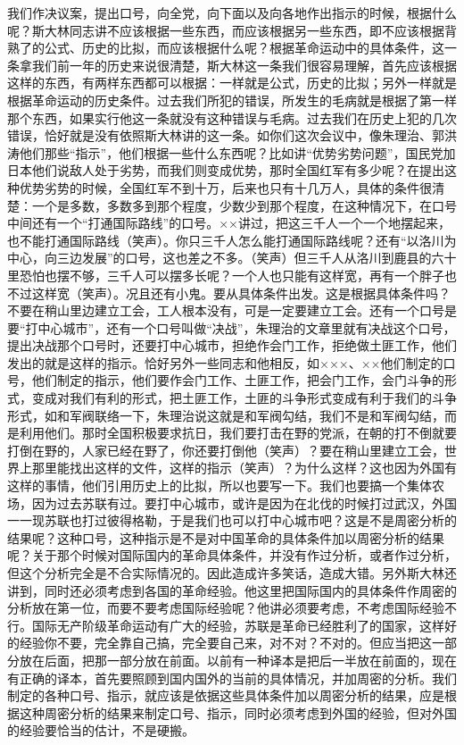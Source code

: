我们作决议案，提出口号，向全党，向下面以及向各地作出指示的时候，根据什么呢？斯大林同志讲不应该根据一些东西，而应该根据另一些东西，即不应该根据背熟了的公式、历史的比拟，而应该根据什么呢？根据革命运动中的具体条件，这一条拿我们前一年的历史来说很清楚，斯大林这一条我们很容易理解，首先应该根据这样的东西，有两样东西都可以根据：一样就是公式，历史的比拟；另外一样就是根据革命运动的历史条件。过去我们所犯的错误，所发生的毛病就是根据了第一样那个东西，如果实行他这一条就没有这种错误与毛病。过去我们在历史上犯的几次错误，恰好就是没有依照斯大林讲的这一条。如你们这次会议中，像朱理治、郭洪涛他们那些“指示”，他们根据一些什么东西呢？比如讲“优势劣势问题”，国民党加日本他们说敌人处于劣势，而我们则变成优势，那时全国红军有多少呢？在提出这种优势劣势的时候，全国红军不到十万，后来也只有十几万人，具体的条件很清楚：一个是多数，多数多到那个程度，少数少到那个程度，在这种情况下，在口号中间还有一个“打通国际路线”的口号。××讲过，把这三千人一个一个地摆起来，也不能打通国际路线（笑声）。你只三千人怎么能打通国际路线呢？还有“以洛川为中心，向三边发展”的口号，这也差之不多。（笑声）但三千人从洛川到鹿县的六十里恐怕也摆不够，三千人可以摆多长呢？一个人也只能有这样宽，再有一个胖子也不过这样宽（笑声）。况且还有小鬼。要从具体条件出发。这是根据具体条件吗？不要在稍山里边建立工会，工人根本没有，可是一定要建立工会。还有一个口号是要“打中心城市”，还有一个口号叫做“决战”，朱理治的文章里就有决战这个口号，提出决战那个口号时，还要打中心城市，担绝作会门工作，拒绝做土匪工作，他们发出的就是这样的指示。恰好另外一些同志和他相反，如×××、××他们制定的口号，他们制定的指示，他们要作会门工作、土匪工作，把会门工作，会门斗争的形式，变成对我们有利的形式，把土匪工作，土匪的斗争形式变成有利于我们的斗争形式，如和军阀联络一下，朱理治说这就是和军阀勾结，我们不是和军阀勾结，而是利用他们。那时全国积极要求抗日，我们要打击在野的党派，在朝的打不倒就要打倒在野的，人家已经在野了，你还要打倒他（笑声）？要在稍山里建立工会，世界上那里能找出这样的文件，这样的指示（笑声）？为什么这样？这也因为外国有这样的事情，他们引用历史上的比拟，所以也要写一下。我们也要搞一个集体农场，因为过去苏联有过。要打中心城市，或许是因为在北伐的时候打过武汉，外国一一现苏联也打过彼得格勒，于是我们也可以打中心城市吧？这是不是周密分析的结果呢？这种口号，这种指示是不是对中国革命的具体条件加以周密分析的结果呢？关于那个时候对国际国内的革命具体条件，并没有作过分析，或者作过分析，但这个分析完全是不合实际情况的。因此造成许多笑话，造成大错。另外斯大林还讲到，同时还必须考虑到各国的革命经验。他这里把国际国内的具体条件作周密的分析放在第一位，而要不要考虑国际经验呢？他讲必须要考虑，不考虑国际经验不行。国际无产阶级革命运动有广大的经验，苏联是革命已经胜利了的国家，这样好的经验你不要，完全靠自己搞，完全要自己来，对不对？不对的。但应当把这一部分放在后面，把那一部分放在前面。以前有一种译本是把后一半放在前面的，现在有正确的译本，首先要照顾到国内国外的当前的具体情况，并加周密的分析。我们制定的各种口号、指示，就应该是依据这些具体条件加以周密分析的结果，应是根据这种周密分析的结果来制定口号、指示，同时必须考虑到外国的经验，但对外国的经验要恰当的估计，不是硬搬。

